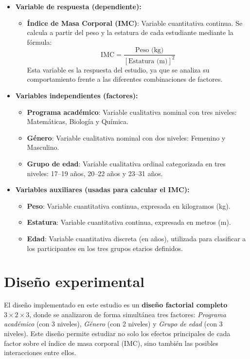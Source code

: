 \documentclass{rapport}
\begin{document}
\begin{itemize}
    \item \textbf{Variable de respuesta (dependiente):}
    \begin{itemize}
        \item \textbf{Índice de Masa Corporal (IMC)}: Variable cuantitativa continua. Se calcula a partir del peso y la estatura de cada estudiante mediante la fórmula: 
        \[
        \text{IMC} = \frac{\text{Peso (kg)}}{[\text{Estatura (m)}]^2}
        \]
        Esta variable es la respuesta del estudio, ya que se analiza su comportamiento frente a las diferentes combinaciones de factores.
    \end{itemize}
    
    \item \textbf{Variables independientes (factores):}
    \begin{itemize}
        \item \textbf{Programa académico}: Variable cualitativa nominal con tres niveles: Matemáticas, Biología y Química.
        \item \textbf{Género}: Variable cualitativa nominal con dos niveles: Femenino y Masculino.
        \item \textbf{Grupo de edad}: Variable cualitativa ordinal categorizada en tres niveles: 17--19 años, 20--22 años y 23--31 años.
    \end{itemize}
    
    \item \textbf{Variables auxiliares (usadas para calcular el IMC):}
    \begin{itemize}
        \item \textbf{Peso}: Variable cuantitativa continua, expresada en kilogramos (kg).
        \item \textbf{Estatura}: Variable cuantitativa continua, expresada en metros (m).
        \item \textbf{Edad}: Variable cuantitativa discreta (en años), utilizada para clasificar a los participantes en los tres grupos etarios definidos.
    \end{itemize}
\end{itemize}


\section{Diseño experimental}

El diseño implementado en este estudio es un \textbf{diseño factorial completo $3 \times 2 \times 3$}, donde se analizaron de forma simultánea tres factores: \textit{Programa académico} (con 3 niveles), \textit{Género} (con 2 niveles) y \textit{Grupo de edad} (con 3 niveles). Este diseño permite estudiar no solo los efectos principales de cada factor sobre el índice de masa corporal (IMC), sino también las posibles interacciones entre ellos.
\end{document}
